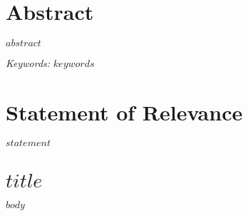 \documentclass[12pt, letterpaper]{article}
\begin{document}
\section{Abstract}

\noindent $abstract$

\textit{Keywords:} $keywords$

\newpage

\section{Statement of Relevance}

\noindent $statement$

\newpage

\section{$title$}

$body$
\end{document}
